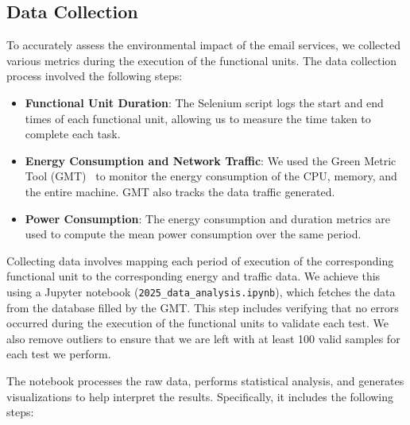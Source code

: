 \documentclass[sigconf,9pt,usenames,dvipsnames,table]{acmart}
\begin{document}
\subsection{Data Collection}

To accurately assess the environmental impact of the email  services, we collected various metrics during the execution of the functional units. The data collection process involved the following steps:

\begin{itemize}
  \item \textbf{Functional Unit Duration}: The Selenium script logs the start and end times of each functional unit, allowing us to measure the time taken to complete each task.
  \item \textbf{Energy Consumption and Network Traffic}: We used the Green Metric Tool (GMT)~\cite{greencoding} to monitor the energy consumption of the CPU, memory, and the entire machine. GMT also tracks the data traffic generated.
  \item \textbf{Power Consumption}: The energy consumption and duration metrics are used to compute the mean power consumption over the same period.
\end{itemize}

Collecting data involves mapping each period of execution of the corresponding functional unit to the corresponding energy and traffic data. We achieve this using a Jupyter notebook (\texttt{2025\_data\_analysis.ipynb}), which fetches the data from the database filled by the GMT. This step includes verifying that no errors occurred during the execution of the functional units to validate each test. We also remove outliers to ensure that we are left with at least 100 valid samples for each test we perform.

The notebook processes the raw data, performs statistical analysis, and generates visualizations to help interpret the results. Specifically, it includes the following steps:
\end{document}
